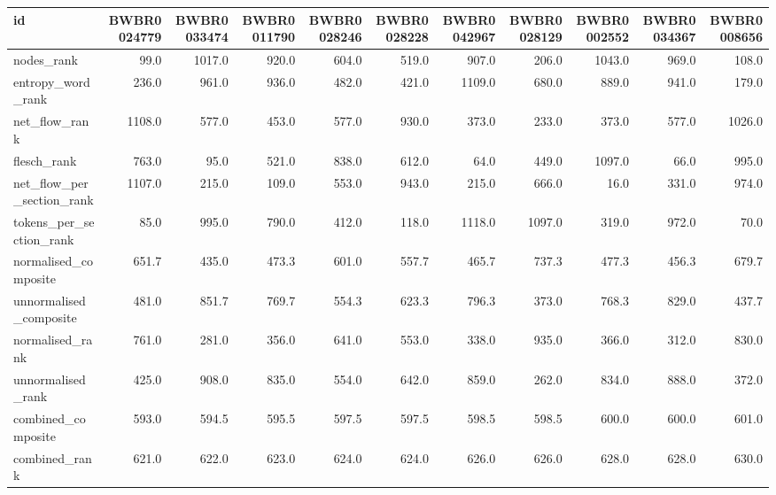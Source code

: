 \begin{tabular}{lrrrrrrrrrr}
\toprule
id & BWBR0024779 & BWBR0033474 & BWBR0011790 & BWBR0028246 & BWBR0028228 & BWBR0042967 & BWBR0028129 & BWBR0002552 & BWBR0034367 & BWBR0008656 \\
\midrule
nodes\_rank & 99.0 & 1017.0 & 920.0 & 604.0 & 519.0 & 907.0 & 206.0 & 1043.0 & 969.0 & 108.0 \\
\cline{1-11}
entropy\_word\_rank & 236.0 & 961.0 & 936.0 & 482.0 & 421.0 & 1109.0 & 680.0 & 889.0 & 941.0 & 179.0 \\
\cline{1-11}
net\_flow\_rank & 1108.0 & 577.0 & 453.0 & 577.0 & 930.0 & 373.0 & 233.0 & 373.0 & 577.0 & 1026.0 \\
\cline{1-11}
flesch\_rank & 763.0 & 95.0 & 521.0 & 838.0 & 612.0 & 64.0 & 449.0 & 1097.0 & 66.0 & 995.0 \\
\cline{1-11}
net\_flow\_per\_section\_rank & 1107.0 & 215.0 & 109.0 & 553.0 & 943.0 & 215.0 & 666.0 & 16.0 & 331.0 & 974.0 \\
\cline{1-11}
tokens\_per\_section\_rank & 85.0 & 995.0 & 790.0 & 412.0 & 118.0 & 1118.0 & 1097.0 & 319.0 & 972.0 & 70.0 \\
\cline{1-11}
normalised\_composite & 651.7 & 435.0 & 473.3 & 601.0 & 557.7 & 465.7 & 737.3 & 477.3 & 456.3 & 679.7 \\
\cline{1-11}
unnormalised\_composite & 481.0 & 851.7 & 769.7 & 554.3 & 623.3 & 796.3 & 373.0 & 768.3 & 829.0 & 437.7 \\
\cline{1-11}
normalised\_rank & 761.0 & 281.0 & 356.0 & 641.0 & 553.0 & 338.0 & 935.0 & 366.0 & 312.0 & 830.0 \\
\cline{1-11}
unnormalised\_rank & 425.0 & 908.0 & 835.0 & 554.0 & 642.0 & 859.0 & 262.0 & 834.0 & 888.0 & 372.0 \\
\cline{1-11}
combined\_composite & 593.0 & 594.5 & 595.5 & 597.5 & 597.5 & 598.5 & 598.5 & 600.0 & 600.0 & 601.0 \\
\cline{1-11}
combined\_rank & 621.0 & 622.0 & 623.0 & 624.0 & 624.0 & 626.0 & 626.0 & 628.0 & 628.0 & 630.0 \\
\cline{1-11}
\bottomrule
\end{tabular}
